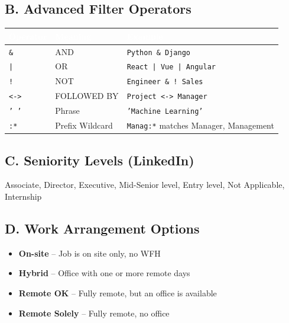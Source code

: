 \documentclass[11pt, a4paper]{article}
\begin{document}
\subsection{B. Advanced Filter Operators}

\begin{center}\small
\begin{tabularx}{\textwidth}{|C{2cm}|L{2.5cm}|X|}
\hline
{}
\textcolor{white}{\textbf{Operator}} & \textcolor{white}{\textbf{Meaning}} & \textcolor{white}{\textbf{Example}} \\
\hline
\texttt{\&} & AND & \texttt{Python \& Django} \\
\texttt{|} & OR & \texttt{React | Vue | Angular} \\
\texttt{!} & NOT & \texttt{Engineer \& ! Sales} \\
\texttt{<->} & FOLLOWED BY & \texttt{Project <-> Manager} \\
\texttt{' '} & Phrase & \texttt{'Machine Learning'} \\
\texttt{:*} & Prefix Wildcard & \texttt{Manag:*} matches Manager, Management \\
\hline
\end{tabularx}
\end{center}

\subsection{C. Seniority Levels (LinkedIn)}

Associate, Director, Executive, Mid-Senior level, Entry level, Not Applicable, Internship

\subsection{D. Work Arrangement Options}

\begin{itemize}[leftmargin=1.5em, itemsep=2pt]
    \item \textbf{On-site} -- Job is on site only, no WFH
    \item \textbf{Hybrid} -- Office with one or more remote days
    \item \textbf{Remote OK} -- Fully remote, but an office is available
    \item \textbf{Remote Solely} -- Fully remote, no office
\end{itemize}
\end{document}

